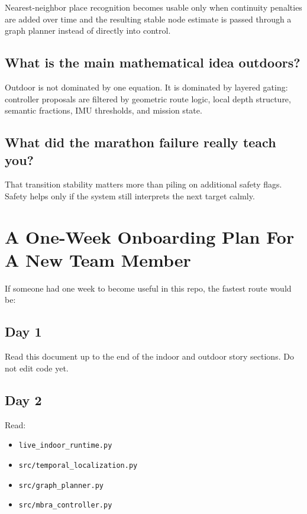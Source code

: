 \documentclass[11pt]{article}
\begin{document}
Nearest-neighbor place recognition becomes usable only when continuity penalties are
added over time and the resulting stable node estimate is passed through a graph
planner instead of directly into control.

\subsection*{What is the main mathematical idea outdoors?}

Outdoor is not dominated by one equation. It is dominated by layered gating:
controller proposals are filtered by geometric route logic, local depth structure,
semantic fractions, IMU thresholds, and mission state.

\subsection*{What did the marathon failure really teach you?}

That transition stability matters more than piling on additional safety flags.
Safety helps only if the system still interprets the next target calmly.

\section{A One-Week Onboarding Plan For A New Team Member}

If someone had one week to become useful in this repo, the fastest route would be:

\subsection*{Day 1}

Read this document up to the end of the indoor and outdoor story sections. Do not
edit code yet.

\subsection*{Day 2}

Read:

\begin{itemize}[nosep]
  \item \texttt{live\_indoor\_runtime.py}
  \item \texttt{src/temporal\_localization.py}
  \item \texttt{src/graph\_planner.py}
  \item \texttt{src/mbra\_controller.py}
\end{itemize}
\end{document}
